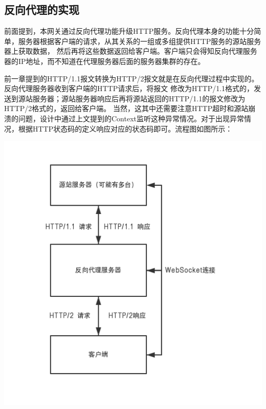 \documentclass[twoside]{CUGThesis}
\begin{document}
	\subsection{反向代理的实现}
	前面提到，本网关通过反向代理功能升级HTTP服务。反向代理本身的功能十分简单，服务器根据客户端的请求，从其关系的一组或多组提供HTTP服务的源站服务器上获取数据，
	然后再将这些数据返回给客户端。客户端只会得知反向代理服务器的IP地址，而不知道在代理服务器后面的服务器集群的存在\cite{郑光勇2010用反向代理技术保护}。 \par 
	前一章提到的HTTP/1.1报文转换为HTTP/2报文就是在反向代理过程中实现的。反向代理服务器收到客户端的HTTP请求后，将报文
	修改为HTTP/1.1格式的，发送到源站服务器；源站服务器响应后再将源站返回的HTTP/1.1的报文修改为HTTP/2格式的，返回给客户端。
	当然，这其中还需要注意HTTP超时和源站崩溃的问题，设计中通过上文提到的Context监听这种异常情况。对于出现异常情况，根据HTTP状态码的定义响应对应的状态码即可。流程图如图所示：\par
	\begin{center}
	\includegraphics[scale=0.56]{Figures/reverse_proxy.png}
	\end{center}
\end{document}
